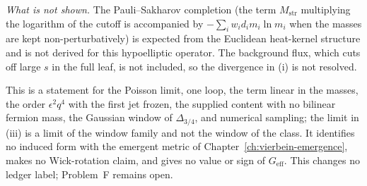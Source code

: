 \emph{What is not shown.} The Pauli--Sakharov completion (the term \(M_{\mathrm{str}}\) multiplying the logarithm of the cutoff is accompanied by \(-\sum_iw_id_im_i\ln m_i\) when the masses are kept non-perturbatively) is expected from the Euclidean heat-kernel structure and is not derived for this hypoelliptic operator. The background flux, which cuts off large \(s\) in the full leaf, is not included, so the divergence in (i) is not resolved.

This is a statement for the Poisson limit, one loop, the term linear in the masses, the order \(\epsilon^2q^4\) with the first jet frozen, the supplied content with no bilinear fermion mass, the Gaussian window of \(\Delta_{3/4}\), and numerical sampling; the limit in (iii) is a limit of the window family and not the window of the class. It identifies no induced form with the emergent metric of Chapter~\ref{ch:vierbein-emergence}, makes no Wick-rotation claim, and gives no value or sign of \(G_{\mathrm{eff}}\). This changes no ledger label; Problem~F remains open.
